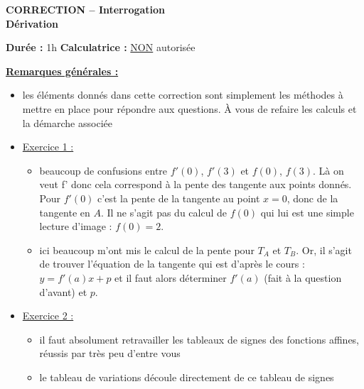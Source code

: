 \documentclass[12pt,a4paper]{exam}
\begin{document}
\begin{center}
    \Large\textbf{CORRECTION -- Interrogation\\Dérivation}
\end{center}

\vspace{0.3cm}

\noindent
\textbf{Durée :} 1h \hfill
\textbf{Calculatrice :} \underline{NON} autorisée

\vspace{0.5cm}

{\color{red}
\underline{\textbf{Remarques générales :}}

\vspace{5pt}
\begin{itemize}
    \item les éléments donnés dans cette correction sont simplement les méthodes à mettre 
    en place pour répondre aux questions. À vous de refaire les calculs et la démarche associée
    \item \underline{Exercice 1 :}
    \begin{itemize}
        \item beaucoup de confusions entre $f'(0)$, $f'(3)$ et $f(0)$, $f(3)$. Là on veut f' donc 
        cela correspond à la pente des tangente aux points donnés. Pour $f'(0)$ c'est la 
        pente de la tangente au point $x=0$, donc de la tangente en $A$. Il ne s'agit pas du calcul
        de $f(0)$ qui lui est une simple lecture d'image : $f(0) = 2$.
        \item ici beaucoup m'ont mis le calcul de la pente pour $T_A$ et $T_B$. Or, il s'agit de trouver 
        l'équation de la tangente qui est d'après le cours : $y = f'(a)x + p$ et il faut alors déterminer $f'(a)$
        (fait à la question d'avant) et $p$.
    \end{itemize}
    \item \underline{Exercice 2 :}
    \begin{itemize}
        \item il faut absolument retravailler les tableaux de signes des fonctions affines, 
        réussis par très peu d'entre vous
        \item le tableau de variations découle directement de ce tableau de signes
    \end{itemize}
\end{itemize}
}
\end{document}

